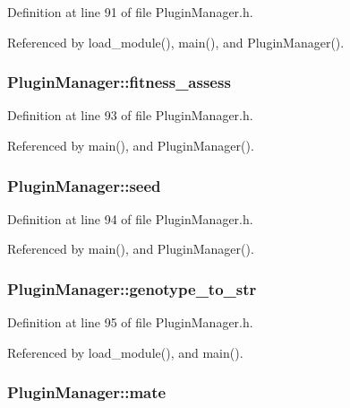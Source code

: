 Definition at line 91 of file PluginManager.h.

Referenced by load\_\-module(), main(), and PluginManager().\hypertarget{classPluginManager_93440ee4d3657d57b795b1cf2c136871}{
\subsubsection{ {\bf PluginManager::fitness\_\-assess}}}
\label{classPluginManager_93440ee4d3657d57b795b1cf2c136871}




Definition at line 93 of file PluginManager.h.

Referenced by main(), and PluginManager().\hypertarget{classPluginManager_d5baa7b8d770b48f3dbf9bcd90817ceb}{
\subsubsection{ {\bf PluginManager::seed}}}
\label{classPluginManager_d5baa7b8d770b48f3dbf9bcd90817ceb}




Definition at line 94 of file PluginManager.h.

Referenced by main(), and PluginManager().\hypertarget{classPluginManager_5cdf0f6cb22a6e4a8f188bafd74d2d88}{
\subsubsection{ {\bf PluginManager::genotype\_\-to\_\-str}}}
\label{classPluginManager_5cdf0f6cb22a6e4a8f188bafd74d2d88}




Definition at line 95 of file PluginManager.h.

Referenced by load\_\-module(), and main().\hypertarget{classPluginManager_6df542bda57cd82fc11dd2b0cc59605b}{
\subsubsection{ {\bf PluginManager::mate}}}
\label{classPluginManager_6df542bda57cd82fc11dd2b0cc59605b}




